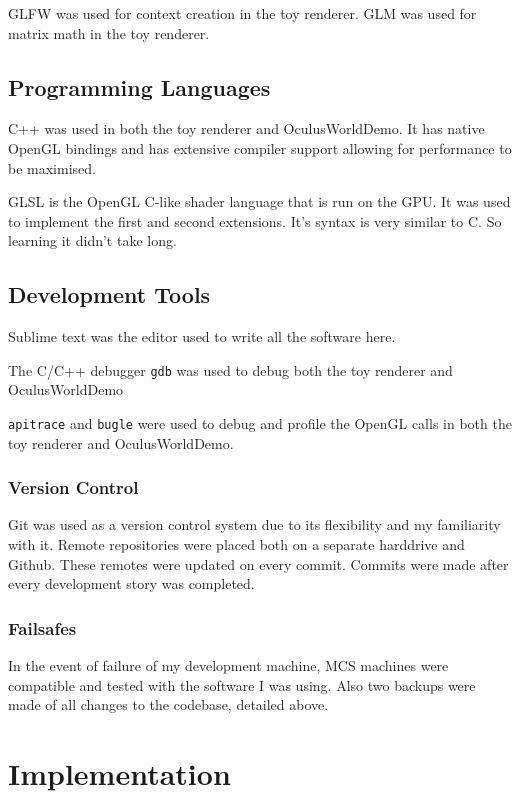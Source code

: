 \documentclass[12pt,a4paper,twoside,openright]{report}
\begin{document}
GLFW was used for context creation in the toy renderer.
GLM was used for matrix math in the toy renderer.

\section{Programming Languages}

C++ was used in both the toy renderer and OculusWorldDemo. It has native OpenGL bindings and has extensive compiler support allowing for performance to be maximised.


GLSL is the OpenGL C-like shader language that is run on the GPU. It was used to implement the first and second extensions. It's syntax is very similar to C. So learning it didn't take long.


\section{Development Tools}

Sublime text was the editor used to write all the software here.

The C/C++ debugger \texttt{gdb} was used to debug both the toy renderer and OculusWorldDemo

\texttt{apitrace} and \texttt{bugle} were used to debug and profile the OpenGL calls in both the toy renderer and OculusWorldDemo.

\subsection{Version Control}

Git was used as a version control system due to its flexibility and my familiarity with it. Remote repositories were placed both on a separate harddrive and Github. These remotes were updated on every commit. Commits were made after every development story was completed.

\subsection{Failsafes}

In the event of failure of my development machine, MCS machines were compatible and tested with the software I was using. Also two backups were made of all changes to the codebase, detailed above.

\chapter{Implementation}
\end{document}
